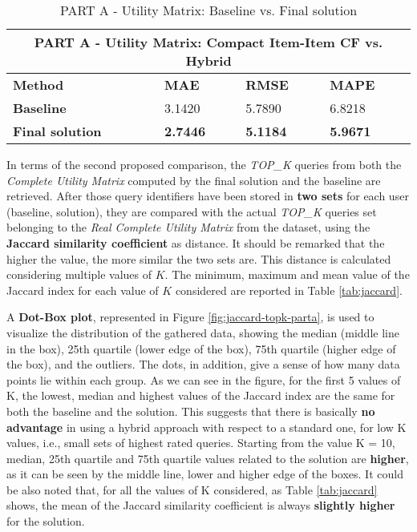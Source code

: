 \begin{table}[h!]
    \centering
    \begin{tabular}{ |p{2cm}||p{1.5cm}|p{1.5cm}|p{1.5cm}|  }
         \hline
         \multicolumn{4}{|c|}{PART A - Utility Matrix: Compact Item-Item CF vs. Hybrid} \\
         \hline
         \textbf{Method}& \textbf{MAE} &\textbf{RMSE} &\textbf{MAPE}\\
         \hline

         \textbf{Baseline} & 3.1420 & 5.7890 & 6.8218\\
         \textbf{Final solution} & \textbf{2.7446} & \textbf{5.1184} & \textbf{5.9671}\\
 
         \hline
    \end{tabular}
    \caption{PART A - Utility Matrix: Baseline vs. Final solution}
    \label{tab:part-a-baseline}
\end{table}


In terms of the second proposed comparison, the \textit{TOP\_K} queries from both the \textit{Complete Utility Matrix} computed by the final solution and the baseline are retrieved. After those query identifiers have been stored in \textbf{two sets} for each user (baseline, solution), they are compared with the actual \textit{TOP\_K} queries set belonging to the \textit{Real Complete Utility Matrix} from the dataset, using the \textbf{Jaccard similarity coefficient} as distance. It should be remarked that the higher the value, the more similar the two sets are.
This distance is calculated considering multiple values of $K$.
The minimum, maximum and mean value of the Jaccard index for each value of $K$ considered are reported in Table \ref{tab:jaccard}.

A \textbf{Dot-Box plot}, represented in Figure \ref{fig:jaccard-topk-parta}, is used to visualize the distribution of the gathered data, showing the median (middle line in the box), 25th quartile (lower edge of the box), 75th quartile (higher edge of the box), and the outliers. The dots, in addition, give a sense of how many data points lie within each group.  
As we can see in the figure, for the first 5 values of K, the lowest, median and highest values of the Jaccard index are the same for both the baseline and the solution. 
This suggests that there is basically \textbf{no advantage} in using a hybrid approach with respect to a standard one, for low K values, i.e., small sets of highest rated queries. 
Starting from the value K = 10, median, 25th quartile and 75th quartile values related to the solution are \textbf{higher}, as it can be seen by the middle line, lower and higher edge of the boxes.
It could be also noted that, for all the values of K considered, as Table \ref{tab:jaccard} shows, the mean of the Jaccard similarity coefficient is always \textbf{slightly higher} for the solution.


